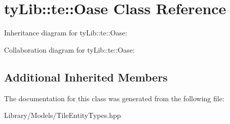 \hypertarget{classty_lib_1_1te_1_1_oase}{}\section{ty\+Lib\+:\+:te\+:\+:Oase Class Reference}
\label{classty_lib_1_1te_1_1_oase}


Inheritance diagram for ty\+Lib\+:\+:te\+:\+:Oase\+:


Collaboration diagram for ty\+Lib\+:\+:te\+:\+:Oase\+:
\subsection*{Additional Inherited Members}


The documentation for this class was generated from the following file\+:\begin{DoxyCompactItemize}
\item 
Library/\+Models/Tile\+Entity\+Types.\+hpp\end{DoxyCompactItemize}
